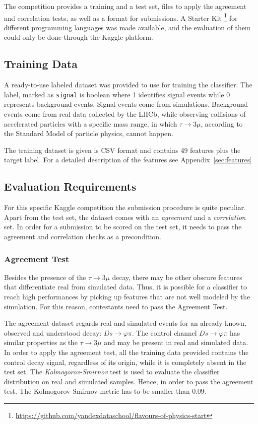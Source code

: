 \documentclass[conference]{IEEEtran}
\begin{document}
The competition provides a training and a test set, files to apply the agreement and correlation tests, as well as a format for submissions. A Starter Kit \footnote{\url{https://github.com/yandexdataschool/flavours-of-physics-start}} for different programming languages was made available, and the evaluation of them could only be done through the Kaggle platform.

\subsection{Training Data}
A ready-to-use labeled dataset was provided to use for training the classifier. The label, marked as \texttt{signal} is boolean where 1 identifies signal events while 0 represents background events. Signal events come from simulations. Background events come from real data collected by the LHCb, while observing collisions of accelerated particles with a specific mass range, in which $\tau \rightarrow 3\mu$, according to the Standard Model of particle physics, cannot happen.

The training dataset is given is CSV format and contains 49 features plus the target label. For a detailed description of the features see Appendix~\ref{sec:features}

\subsection{Evaluation Requirements}
For this specific Kaggle competition the submission procedure is quite peculiar. Apart from the test set, the dataset comes with an \textit{agreement} and a \textit{correlation} set. In order for a submission to be scored on the test set, it needs to pass the agreement and correlation checks as a precondition.

\subsubsection{Agreement Test}
\label{sec:agreement}
Besides the presence of the $\tau \rightarrow 3\mu$ decay, there may be other obscure features that differentiate real from simulated data. Thus, it is possible for a classifier to reach high performances by picking up features that are not well modeled by the simulation. For this reason, contestants need to pass the Agreement Test.

The agreement dataset regards real and simulated events for an already known, observed and understood decay: $Ds \rightarrow \varphi\pi$. The control channel $Ds
\rightarrow \varphi\pi$ has similar properties as the $\tau \rightarrow 3\mu$ and may be present in real and simulated data. In order to apply the agreement test, all the training data provided contains the control decay signal, regardless of its origin, while it is completely absent in the test set. The \textit{Kolmogorov-Smirnov} test is used to evaluate the classifier distribution on real and simulated samples. Hence, in order to pass the agreement test, The Kolmogorov-Smirnov metric has to be smaller than 0.09.
\end{document}
